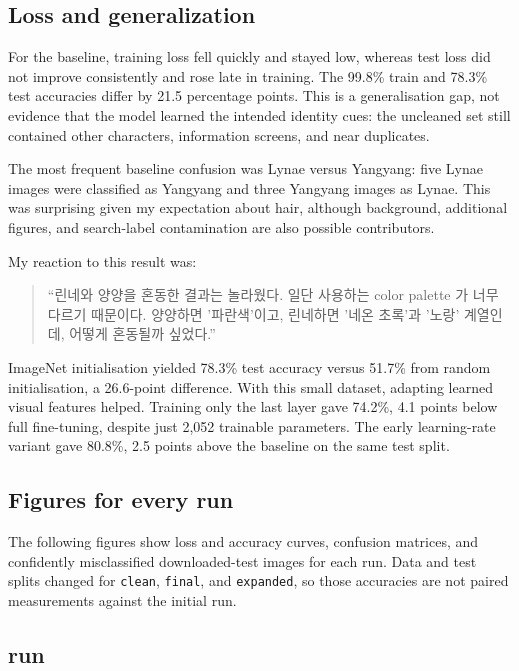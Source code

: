 \documentclass[11pt]{article}
\begin{document}
\subsection*{Loss and generalization}
For the baseline, training loss fell quickly and stayed low, whereas test loss did not improve consistently and rose late in training. The 99.8\% train and 78.3\% test accuracies differ by 21.5 percentage points. This is a generalisation gap, not evidence that the model learned the intended identity cues: the uncleaned set still contained other characters, information screens, and near duplicates.

The most frequent baseline confusion was Lynae versus Yangyang: five Lynae images were classified as Yangyang and three Yangyang images as Lynae. This was surprising given my expectation about hair, although background, additional figures, and search-label contamination are also possible contributors.

My reaction to this result was:
\begin{quote}
``린네와 양양을 혼동한 결과는 놀라웠다. 일단 사용하는 color palette 가 너무 다르기 때문이다. 양양하면 '파란색'이고, 린네하면 '네온 초록'과 '노랑' 계열인데, 어떻게 혼동될까 싶었다.''
\end{quote}

ImageNet initialisation yielded 78.3\% test accuracy versus 51.7\% from random initialisation, a 26.6-point difference. With this small dataset, adapting learned visual features helped. Training only the last layer gave 74.2\%, 4.1 points below full fine-tuning, despite just 2,052 trainable parameters. The early learning-rate variant gave 80.8\%, 2.5 points above the baseline on the same test split.

\subsection*{Figures for every run}
The following figures show loss and accuracy curves, confusion matrices, and confidently misclassified downloaded-test images for each run. Data and test splits changed for \texttt{clean}, \texttt{final}, and \texttt{expanded}, so those accuracies are not paired measurements against the initial run.

\subsection*{run}
\par\noindent {}\par
\begin{center}\par\noindent {}\par\end{center}
\par\noindent {}\par
\clearpage
\end{document}
